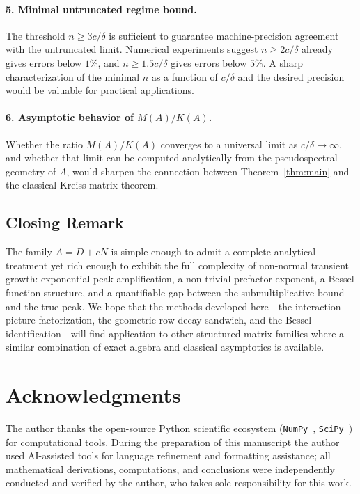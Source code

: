 \documentclass[11pt,reqno]{article}
\theoremstyle{plain}
\theoremstyle{definition}
\theoremstyle{remark}
\numberwithin{equation}{section}
\begin{document}
\paragraph{5. Minimal untruncated regime bound.} The threshold $n \ge 3c/\delta$ is sufficient to guarantee machine-precision agreement with the untruncated limit. Numerical experiments suggest $n \ge 2c/\delta$ already gives errors below $1\%$, and $n \ge 1.5c/\delta$ gives errors below $5\%$. A sharp characterization of the minimal $n$ as a function of $c/\delta$ and the desired precision would be valuable for practical applications.

\paragraph{6. Asymptotic behavior of $M(A)/K(A)$.} Whether the ratio $M(A)/K(A)$ converges to a universal limit as $c/\delta \to \infty$, and whether that limit can be computed analytically from the pseudospectral geometry of $A$, would sharpen the connection between Theorem~\ref{thm:main} and the classical Kreiss matrix theorem.

\subsection{Closing Remark}\label{subsec:closing}

The family $A = D + cN$ is simple enough to admit a complete analytical treatment yet rich enough to exhibit the full complexity of non-normal transient growth: exponential peak amplification, a non-trivial prefactor exponent, a Bessel function structure, and a quantifiable gap between the submultiplicative bound and the true peak. We hope that the methods developed here---the interaction-picture factorization, the geometric row-decay sandwich, and the Bessel identification---will find application to other structured matrix families where a similar combination of exact algebra and classical asymptotics is available.

\section*{Acknowledgments}

The author thanks the open-source Python scientific ecosystem (\texttt{NumPy}~\cite{Harris2020}, \texttt{SciPy}~\cite{Virtanen2020}) for computational tools. During the preparation of this manuscript the author used AI-assisted tools for language refinement and formatting assistance; all mathematical derivations, computations, and conclusions were independently conducted and verified by the author, who takes sole responsibility for this work.
\end{document}
